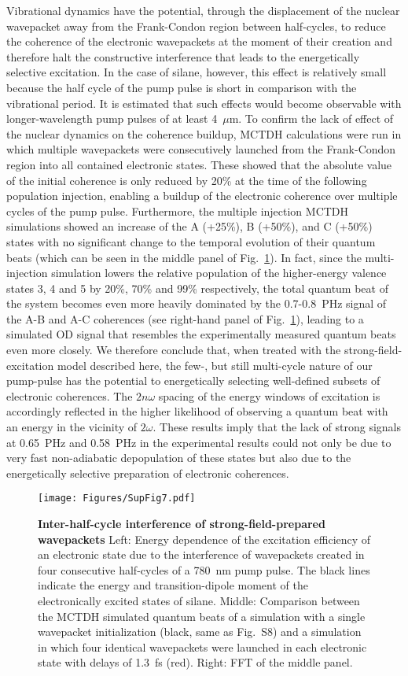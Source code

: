 \documentclass[12pt]{article}
\begin{document}
Vibrational dynamics have the potential, through the displacement of the nuclear wavepacket away from the Frank-Condon region between half-cycles, to reduce the coherence of the electronic wavepackets at the moment of their creation and therefore halt the constructive interference that leads to the energetically selective excitation. In the case of silane, however, this effect is relatively small because the half cycle of the pump pulse is short in comparison with the vibrational period. It is estimated that such effects would become observable with longer-wavelength pump pulses of at least 4~\(\mu\)m. To confirm the lack of effect of the nuclear dynamics on the coherence buildup, MCTDH calculations were run in which multiple wavepackets were consecutively launched from the Frank-Condon region into all contained electronic states. These showed that the absolute value of the initial coherence is only reduced by 20\% at the time of the following population injection, enabling a buildup of the electronic coherence over multiple cycles of the pump pulse. Furthermore, the multiple injection MCTDH simulations showed an increase of the A (+25\%), B (+50\%), and C (+50\%) states with no significant change to the temporal evolution of their quantum beats (which can be seen in the middle panel of Fig.~\ref{MulticycleFig}). In fact, since the multi-injection simulation lowers the relative population of the higher-energy valence states 3, 4 and 5 by 20\%, 70\% and 99\% respectively, the total quantum beat of the system becomes even more heavily dominated by the 0.7-0.8~PHz signal of the A-B and A-C coherences (see right-hand panel of Fig.~\ref{MulticycleFig}), leading to a simulated OD signal that resembles the experimentally measured quantum beats even more closely. 
We therefore conclude that, when treated with the strong-field-excitation model described here, the few-, but still multi-cycle nature of our pump-pulse has the potential to energetically selecting well-defined subsets of electronic coherences. The $2n\omega$ spacing of the energy windows of excitation is accordingly reflected in the higher likelihood of observing a quantum beat with an energy in the vicinity of $2\omega$. These results imply that the lack of strong signals at 0.65~PHz and 0.58~PHz in the experimental results could not only be due to very fast non-adiabatic depopulation of these states but also due to the energetically selective preparation of electronic coherences. 
\begin{figure}[h!]
\centering
\texttt{[image: Figures/SupFig7.pdf]} \label{MulticycleFig}
\caption{\textbf{Inter-half-cycle interference of strong-field-prepared wavepackets} Left: Energy dependence of the excitation efficiency of an electronic state due to the interference of wavepackets created in four consecutive half-cycles of a 780~nm pump pulse. The black lines indicate the energy and transition-dipole moment of the electronically excited states of silane. Middle: Comparison between the MCTDH simulated quantum beats of a simulation with a single wavepacket initialization (black, same as Fig.~S8) and a simulation in which four identical wavepackets were launched in each electronic state with delays of 1.3~fs (red). Right: FFT of the middle panel.}
\end{figure}

\clearpage




\end{document}
